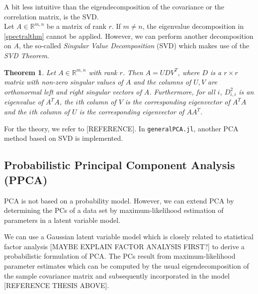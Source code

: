 \documentclass[journal, a4paper]{IEEEtran}
\newtheorem{theorem}{Theorem}[section]
\begin{document}
A bit less intuitive than the eigendecomposition of the covariance or the correlation matrix, is the SVD.\\
Let \( A \in \mathbb{R}^{m,n} \) be a matrix of rank \( r \). If \( m \neq n\), the eigenvalue decomposition in \ref{spectralthm} cannot be applied. However, we can perform another decomposition on \( A \), the so-called \textit{Singular Value Decomposition} (SVD) which makes use of the \textit{SVD Theorem}.
\begin{theorem}\label{svdthm}
	Let \( A \in \mathbb{R}^{m,n} \) with rank \( r \). Then \( A = UDV^T\), where \( D \) is a \( r \times r \) matrix with non-zero singular values of \( A \) and the columns of \( U, V \) are orthonormal left and right singular vectors of \( A \). Furthermore, for all \( i \), \( D_{i,i}^{2} \) is an eigenvalue of \( A^T A\), the \( i \)th column of \( V \) is the corresponding eigenvector of \( A^T A\) and the \( i \)th column of \( U \) is the corresponding eigenvector of \( A A^T\).
\end{theorem}

For the theory, we refer to [REFERENCE]. 
In \texttt{generalPCA.jl}, another PCA method based on SVD is implemented.



\subsection{Probabilistic Principal Component Analysis (PPCA)}

PCA is not based on a probability model. However, we can extend PCA by determining the PCs of a data set by maximum-likelihood estimation of parameters in a latent variable model.

We can use a Gaussian latent variable model which is closely related to statistical factor analysis  [MAYBE EXPLAIN FACTOR ANALYSIS FIRST?] to derive a probabilistic formulation of PCA. The PCs result from maximum-likelihood parameter estimates which can be computed by the usual eigendecomposition of the sample covariance matrix and subsequently incorporated in the model [REFERENCE THESIS ABOVE]. 
\end{document}
